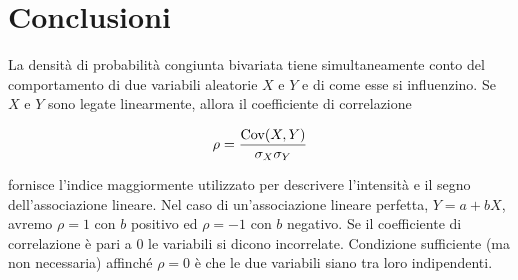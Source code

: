 \documentclass[
  11pt,
]{krantz}
\theoremstyle{definition}
\theoremstyle{definition}
\theoremstyle{definition}
\theoremstyle{definition}
\theoremstyle{remark}
\begin{document}
\hypertarget{conclusioni}{%
\section*{Conclusioni}\label{conclusioni}}


La densità di probabilità congiunta bivariata tiene simultaneamente conto del comportamento di due variabili aleatorie \(X\) e \(Y\) e di come esse si influenzino. Se \(X\) e \(Y\) sono legate linearmente, allora il coefficiente di correlazione

\begin{equation}
\rho = \frac{\mbox{Cov}(X, Y)}{\sigma_X \sigma_Y}\notag
\end{equation}

fornisce l'indice maggiormente utilizzato per descrivere l'intensità e il segno dell'associazione lineare. Nel caso di un'associazione lineare perfetta, \(Y = a + bX\), avremo \(\rho = 1\) con \(b\) positivo ed \(\rho = -1\) con \(b\) negativo. Se il coefficiente di correlazione è pari a 0 le variabili si dicono incorrelate. Condizione sufficiente (ma non necessaria) affinché \(\rho = 0\) è che le due variabili siano tra loro indipendenti.

  

\printindex
\end{document}
